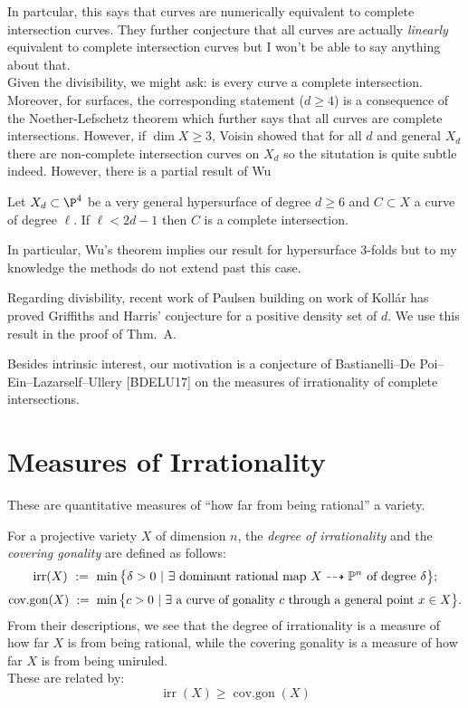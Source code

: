 \documentclass[12pt]{article}
\theoremstyle{plain}
\DeclareMathOperator{\irr}{irr}
\DeclareMathOperator{\cov}{cov.gon}
\newcommand{\mb}[1]{\mathbb{#1}}
\DeclareMathOperator{\cg}{cov.gon}
\begin{document}
In partcular, this says that curves are numerically equivalent to complete intersection curves. They further conjecture that all curves are actually \textit{linearly} equivalent to complete intersection curves but I won't be able to say anything about that. 
\bigskip\\
{\color{red} Given the divisibility, we might ask: is every curve a complete intersection.
Moreover, for surfaces, the corresponding statement ($d \ge 4$) is a consequence of the Noether-Lefschetz theorem which further says that all curves are complete intersections. However, if $\dim{X} \ge 3$, Voisin showed that for all $d$ and general $X_d$ there are non-complete intersection curves on $X_d$ so the situtation is quite subtle indeed. However, there is a partial result of Wu}

\begin{theorem}[Wu, '90]
Let $X_d \subset \P^4$ be a very general hypersurface of degree $d \ge 6$ and $C \subset X$ a curve of degree $\ell$. If $\ell < 2d - 1$ then $C$ is a complete intersection.
\end{theorem}

{\color{red} In particular, Wu's theorem implies our result for hypersurface 3-folds but to my knowledge the methods do not extend past this case.}

Regarding divisbility, recent work of Paulsen building on work of Koll\'{a}r has proved Griffiths and Harris' conjecture for a positive density set of $d$. We use this result in the proof of Thm.~A.

{\color{red} Besides intrinsic interest, our motivation is a conjecture of Bastianelli--De Poi--Ein--Lazarself--Ullery [BDELU17] on the measures of irrationality of complete intersections.}

\section{Measures of Irrationality}

{\color{red} These are quantitative measures of ``how far from being rational'' a variety. }

For a projective variety $X$ of dimension $n$, the \emph{degree of irrationality} and the \emph{covering gonality} are defined as follows:
\[ \irr(X)\ :=\ \min\big\{\delta>0\ |\ \exists\textup{ dominant rational map } X\dashrightarrow \mb{P}^n\textup{ of degree }\delta\big\}; \]
\[ \cov(X)\ :=\ \min\big\{c>0\ |\ \exists\textup{ a curve of gonality } c \textup{ through a general point } x\in X\big\}.\]
{\color{red} From their descriptions, we see that the degree of irrationality is a measure of how far $X$ is from being rational, while the covering gonality is a measure of how far $X$ is from being uniruled.} 
\bigskip\\
These are related by: 
\[ \irr(X) \geq \cg(X) \]
\end{document}
